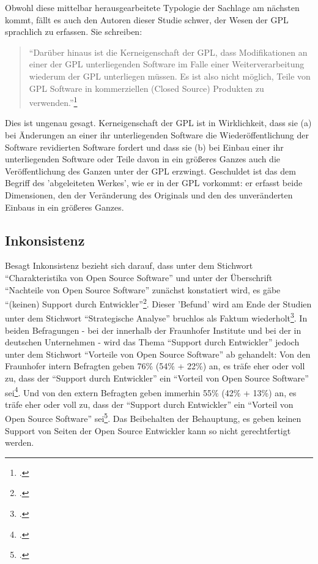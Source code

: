 \documentclass[DIV=calc,BCOR=5mm,11pt,headings=small,oneside,abstract=true, toc=bib]{scrartcl}
\begin{document}
Obwohl diese mittelbar herausgearbeitete Typologie der Sachlage am nächsten
kommt, fällt es auch den Autoren dieser Studie schwer, der Wesen der GPL
sprachlich zu erfassen. Sie schreiben:

\begin{quote}\enquote{Darüber hinaus ist die Kerneigenschaft der GPL, dass
Modifikationen an einer der GPL unterliegenden Software im Falle einer
Weiterverarbeitung wiederum der GPL unterliegen müssen. Es ist also nicht
möglich, Teile von GPL Software in kommerziellen (Closed Source) Produkten zu
verwenden.}\footcite[][20]{RenVetRexKet2005a}
\end{quote}

Dies ist ungenau gesagt. Kerneigenschaft der GPL ist in Wirklichkeit, dass sie
(a) bei Änderungen an einer ihr unterliegenden Software die Wiederöffentlichung
der Software revidierten Software fordert und dass sie (b) bei Einbau einer ihr
unterliegenden Software oder Teile davon in ein größeres Ganzes auch die
Veröffentlichung des Ganzen unter der GPL erzwingt. Geschuldet ist das dem
Begriff des 'abgeleiteten Werkes', wie er in der GPL vorkommt: er erfasst beide
Dimensionen, den der Veränderung des Originals und den des unveränderten Einbaus
in ein größeres Ganzes.

\subsection{Inkonsistenz}

Besagt Inkonsistenz bezieht sich darauf, dass unter dem Stichwort
\enquote{Charakteristika von Open Source Software} und unter der Überschrift
\enquote{Nachteile von Open Source Software} zunächst konstatiert wird, es
gäbe \enquote{(keinen) Support durch
Entwickler}\footcite[vgl.][17]{RenVetRexKet2005a}. Dieser 'Befund' wird am
Ende der Studien unter dem Stichwort \enquote{Strategische Analyse} bruchlos
als Faktum wiederholt\footcite[vgl.][172]{RenVetRexKet2005a}. In beiden
Befragungen - bei der innerhalb der Fraunhofer Institute und bei der in
deutschen Unternehmen - wird das Thema \enquote{Support durch Entwickler}
jedoch unter dem Stichwort \enquote{Vorteile von Open Source Software} ab
gehandelt: Von den Fraunhofer intern Befragten geben 76\% (54\% + 22\%) an, es
träfe eher oder voll zu, dass der \enquote{Support durch Entwickler} ein
\enquote{Vorteil von Open Source Software}
sei\footcite[vgl.][56]{RenVetRexKet2005a}. Und von den extern Befragten geben
immerhin 55\% (42\% + 13\%) an, es träfe eher oder voll zu, dass der
\enquote{Support durch Entwickler} ein \enquote{Vorteil von Open Source
Software} sei\footcite[vgl.][69]{RenVetRexKet2005a}. Das Beibehalten der
Behauptung, es geben keinen Support von Seiten der Open Source Entwickler kann
so nicht gerechtfertigt werden.
\end{document}
